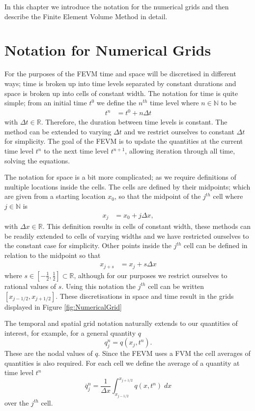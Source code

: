 In this chapter we introduce the notation for the numerical grids and then describe the Finite Element Volume Method in detail.

\section{Notation for Numerical Grids}

For the purposes of the FEVM time and space will be discretised in different ways; time is broken up into time levels separated by constant durations and space is broken up into cells of constant width. The notation for time is quite simple; from an initial time $t^0$ we define the $n^{th}$ time level where $n \in \mathbb{N}$ to be
\begin{align*}
t^n &= t^0 + n \Delta t
\end{align*}
with $\Delta t \in \mathbb{R}$. Therefore, the duration between time levels is constant. The method can be extended to varying $\Delta t$ and we restrict ourselves to constant $\Delta t$ for simplicity. The goal of the FEVM is to update the quantities at the current time level $t^n$ to the next time level $t^{n+1}$, allowing iteration through all time, solving the equations. 

The notation for space is a bit more complicated; as we require definitions of multiple locations inside the cells. The cells are defined by their midpoints; which are given from a starting location $x_0$, so that the midpoint of the $j^{th}$ cell where $j \in \mathbb{N}$ is
\begin{align*}
x_j &= x_0 + j \Delta x,
\end{align*}
with $\Delta x \in \mathbb{R}$. This definition results in cells of constant width, these methods can be readily extended to cells of varying widths and we have restricted ourselves to the constant case for simplicity. Other points inside the $j^{th}$ cell can be defined in relation to the midpoint so that 
\begin{align*}
x_{j + s} &= x_j + s \Delta x
\end{align*}
where $s \in \left[-\frac{1}{2} , \frac{1}{2}\right]  \subset\mathbb{R}$, although for our purposes we restrict ourselves to rational values of $s$. Using this notation the $j^{th}$ cell can be written $\left[x_{j -1/2},x_{j + 1/2}\right]$. These discretisations in space and time result in the grids displayed in Figure \ref{fig:NumericalGrid}

The temporal and spatial grid notation naturally extends to our quantities of interest, for example, for a general quantity $q$
\begin{equation*}
q^n_j = q(x_j ,t^n). 
\end{equation*}
These are the nodal values of $q$. Since the FEVM uses a FVM the cell averages of quantities is also required. For each cell we define the average of a quantity at time level $t^n$
\begin{equation*}
\overline{q}_j^n = \frac{1}{\Delta x} \int_{x_{j-1/2}}^{x_{j+1/2}} q(x,t^n) \; dx
\end{equation*}
over the $j^{th}$ cell.

